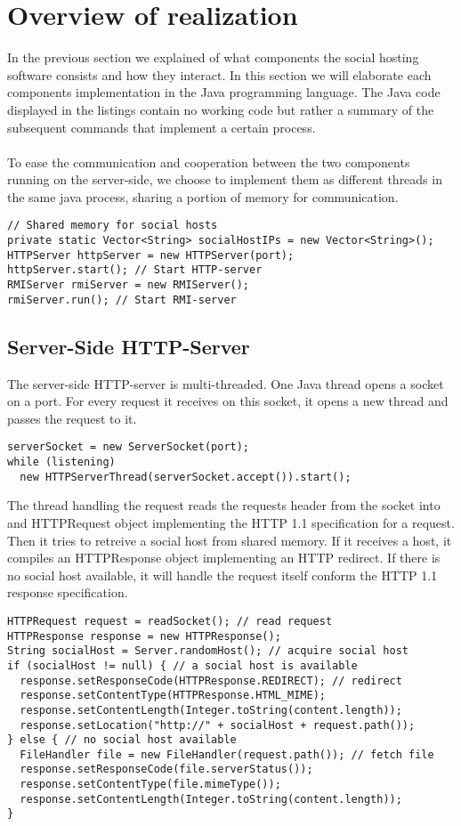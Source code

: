 \documentclass[a4paper, 10pt]{article}
\begin{document}
\section{Overview of realization}
In the previous section we explained of what components the social hosting software consists and how they interact. In this section we will elaborate each components implementation in the Java programming language. The Java code displayed in the listings contain no working code but rather a summary of the subsequent commands that implement a certain process.
\\
\\
To ease the communication and cooperation between the two components running on the server-side, we choose to implement them as different threads in the same java process, sharing a portion of memory for communication.
\begin{lstlisting}
// Shared memory for social hosts
private static Vector<String> socialHostIPs = new Vector<String>(); 
HTTPServer httpServer = new HTTPServer(port); 
httpServer.start(); // Start HTTP-server
RMIServer rmiServer = new RMIServer();
rmiServer.run(); // Start RMI-server
\end{lstlisting}

\subsection{Server-Side HTTP-Server}
The server-side HTTP-server is multi-threaded. One Java thread opens a socket on a port. For every request it receives on this socket, it opens a new thread and passes the request to it. 
\begin{lstlisting}
serverSocket = new ServerSocket(port);
while (listening)
  new HTTPServerThread(serverSocket.accept()).start();
\end{lstlisting}
The thread handling the request reads the requests header from the socket into and HTTPRequest object implementing the HTTP 1.1 specification for a request. Then it tries to retreive a social host from shared memory. If it receives a host, it compiles an HTTPResponse object implementing an HTTP redirect. If there is no social host available, it will handle the request itself conform the HTTP 1.1 response specification.
\begin{lstlisting}
HTTPRequest request = readSocket(); // read request
HTTPResponse response = new HTTPResponse();
String socialHost = Server.randomHost(); // acquire social host
if (socialHost != null) { // a social host is available
  response.setResponseCode(HTTPResponse.REDIRECT); // redirect
  response.setContentType(HTTPResponse.HTML_MIME);
  response.setContentLength(Integer.toString(content.length));
  response.setLocation("http://" + socialHost + request.path());
} else { // no social host available
  FileHandler file = new FileHandler(request.path()); // fetch file
  response.setResponseCode(file.serverStatus());
  response.setContentType(file.mimeType());
  response.setContentLength(Integer.toString(content.length));
}
\end{lstlisting}
\end{document}
